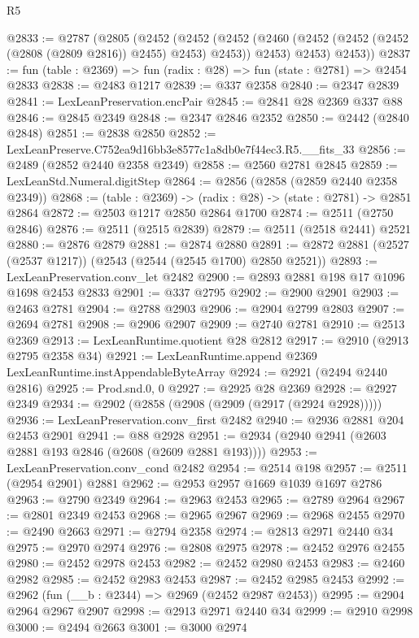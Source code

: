\begin{lexlean}{R5}
\begin{coremodule}
@2833 := @2787
    (@2805
      (@2452
        (@2452
          (@2452 (@2460 (@2452 (@2452 (@2452 (@2808 (@2809 @2816)) @2455) @2453) @2453)) @2453)
          @2453)
        @2453))
@2837 := fun (table : @2369) => fun (radix : @28) => fun (state : @2781) => @2454 @2833
@2838 := @2483 @1217
@2839 := @337 @2358
@2840 := @2347 @2839
@2841 := LexLeanPreservation.encPair
@2845 := @2841 @28 @2369 @337 @88
@2846 := @2845 @2349
@2848 := @2347 @2846 @2352
@2850 := @2442 (@2840 @2848)
@2851 := @2838 @2850
@2852 := LexLeanPreserve.C752ea9d16bb3e8577c1a8db0e7f44ec3.R5.__fits_33
@2856 := @2489 (@2852 @2440 @2358 @2349)
@2858 := @2560 @2781 @2845
@2859 := LexLeanStd.Numeral.digitStep
@2864 := @2856 (@2858 (@2859 @2440 @2358 @2349))
@2868 := (table : @2369) -> (radix : @28) -> (state : @2781) -> @2851 @2864
@2872 := @2503 @1217 @2850 @2864 @1700
@2874 := @2511 (@2750 @2846)
@2876 := @2511 (@2515 @2839)
@2879 := @2511 (@2518 @2441) @2521
@2880 := @2876 @2879
@2881 := @2874 @2880
@2891 := @2872 @2881 (@2527 (@2537 @1217)) (@2543 (@2544 (@2545 @1700) @2850 @2521))
@2893 := LexLeanPreservation.conv_let @2482
@2900 := @2893 @2881 @198 @17 @1096 @1698 @2453 @2833
@2901 := @337 @2795
@2902 := @2900 @2901
@2903 := @2463 @2781
@2904 := @2788 @2903
@2906 := @2904 @2799 @2803
@2907 := @2694 @2781
@2908 := @2906 @2907
@2909 := @2740 @2781
@2910 := @2513 @2369
@2913 := LexLeanRuntime.quotient @28 @2812
@2917 := @2910 (@2913 @2795 @2358 @34)
@2921 := LexLeanRuntime.append @2369 LexLeanRuntime.instAppendableByteArray
@2924 := @2921 (@2494 @2440 @2816)
@2925 := Prod.snd.{0, 0}
@2927 := @2925 @28 @2369
@2928 := @2927 @2349
@2934 := @2902 (@2858 (@2908 (@2909 (@2917 (@2924 @2928)))))
@2936 := LexLeanPreservation.conv_first @2482
@2940 := @2936 @2881 @204 @2453 @2901
@2941 := @88 @2928
@2951 := @2934 (@2940 @2941 (@2603 @2881 @193 @2846 (@2608 (@2609 @2881 @193))))
@2953 := LexLeanPreservation.conv_cond @2482
@2954 := @2514 @198
@2957 := @2511 (@2954 @2901) @2881
@2962 := @2953 @2957 @1669 @1039 @1697 @2786
@2963 := @2790 @2349
@2964 := @2963 @2453
@2965 := @2789 @2964
@2967 := @2801 @2349 @2453
@2968 := @2965 @2967
@2969 := @2968 @2455
@2970 := @2490 @2663
@2971 := @2794 @2358
@2974 := @2813 @2971 @2440 @34
@2975 := @2970 @2974
@2976 := @2808 @2975
@2978 := @2452 @2976 @2455
@2980 := @2452 @2978 @2453
@2982 := @2452 @2980 @2453
@2983 := @2460 @2982
@2985 := @2452 @2983 @2453
@2987 := @2452 @2985 @2453
@2992 := @2962 (fun (__b : @2344) => @2969 (@2452 @2987 @2453))
@2995 := @2904 @2964 @2967 @2907
@2998 := @2913 @2971 @2440 @34
@2999 := @2910 @2998
@3000 := @2494 @2663
@3001 := @3000 @2974

\end{coremodule}
\end{lexlean}
